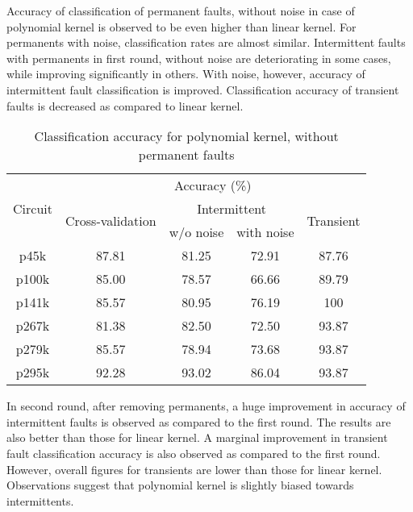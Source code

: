 Accuracy of classification of permanent faults, without noise in case of polynomial kernel is observed to be even higher than linear kernel. For permanents with noise, classification rates are almost similar. Intermittent faults with permanents in first round, without noise are deteriorating in some cases, while improving significantly in others. With noise, however, accuracy of intermittent fault classification is improved. Classification accuracy of transient faults is decreased as compared to linear kernel.

\begin{table}[h]

	\captionsetup{justification=centering}
\begin{tabular}{ccccc}
\hline
\multirow{3}{*}{Circuit} & \multicolumn{4}{c}{Accuracy (\%)}\\ \cline{2-5} 
                         & \multirow{2}{*}{Cross-validation} & \multicolumn{2}{c}{Intermittent} & \multirow{2}{*}{Transient} \\ \cline{3-4}
                         &                                   & w/o noise      & with noise      &                            \\ \hline
p45k                     & 87.81                             & 81.25          & 72.91           & 87.76                      \\
p100k                    & 85.00                             & 78.57          & 66.66           & 89.79                      \\
p141k                    & 85.57                             & 80.95          & 76.19           & 100                        \\
p267k                    & 81.38                             & 82.50          & 72.50           & 93.87                      \\
p279k                    & 85.57                             & 78.94          & 73.68           & 93.87                      \\
p295k                    & 92.28                             & 93.02          & 86.04           & 93.87                      \\
\hline
\end{tabular}
\caption {Classification accuracy for polynomial kernel, without permanent faults}
\label{tab:polywop}
\end{table}

In second round, after removing permanents, a huge improvement in accuracy of intermittent faults is observed as compared to the first round. The results are also better than those for linear kernel.  A marginal improvement in transient fault classification accuracy is also observed as compared to the first round. However, overall figures for transients are lower than those for linear kernel. Observations suggest that polynomial kernel is slightly biased towards intermittents.


